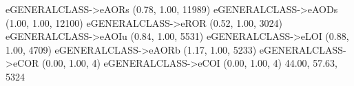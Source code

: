 eGENERALCLASS->eAORs (0.78, 1.00, 11989)
eGENERALCLASS->eAODs (1.00, 1.00, 12100)
eGENERALCLASS->eROR (0.52, 1.00, 3024)
eGENERALCLASS->eAOIu (0.84, 1.00, 5531)
eGENERALCLASS->eLOI (0.88, 1.00, 4709)
eGENERALCLASS->eAORb (1.17, 1.00, 5233)
eGENERALCLASS->eCOR (0.00, 1.00, 4)
eGENERALCLASS->eCOI (0.00, 1.00, 4)
44.00, 57.63, 5324

